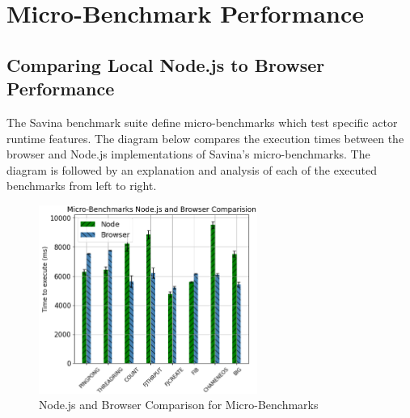 \documentclass[oneside]{um-fict}
\begin{document}
\section{Micro-Benchmark Performance}
\subsection{Comparing Local Node.js to Browser Performance}
The Savina benchmark suite define micro-benchmarks which test specific actor runtime features. The diagram below compares the execution times between the browser and Node.js implementations of Savina's micro-benchmarks. The diagram is followed by an explanation and analysis of each of the executed benchmarks from left to right.
\begin{figure}[H]
    \begin{centering}
        \includegraphics[width=270px]{resources/micro.png}
        \caption{Node.js and Browser Comparison for Micro-Benchmarks}
    \end{centering}
\end{figure}
\end{document}
